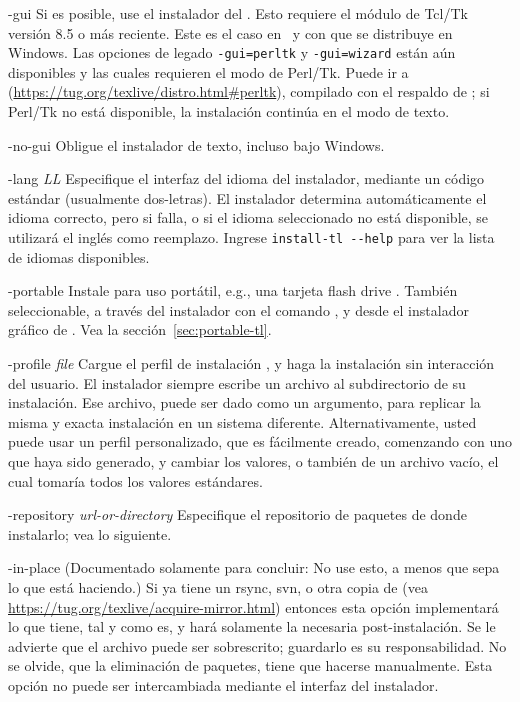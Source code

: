 \documentclass{article}
\begin{document}
\begin{ttdescription}
\item[-gui] Si es posible, use el instalador del \GUI{}. Esto requiere
		el módulo de Tcl/Tk versión 8.5 o más reciente.  Este es el
		caso en \MacOSX\ y con \TL{} que se distribuye en Windows.  Las
		opciones de legado \texttt{-gui=perltk} y \texttt{-gui=wizard}
		están aún disponibles y las cuales requieren el modo de
		Perl/Tk. Puede ir a
		(\url{https://tug.org/texlive/distro.html#perltk}), compilado
		con el respaldo de ; si Perl/Tk no está disponible,
		la instalación continúa en el modo de texto. 

\item[-no-gui] Obligue el instalador de texto, incluso bajo Windows. 

\item[-lang {\sl LL}] Especifique el interfaz del idioma del
	instalador, mediante un código estándar (usualmente
	dos-letras). El instalador determina automáticamente el idioma
	correcto, pero si falla, o si el idioma seleccionado no está
	disponible, se utilizará el inglés como reemplazo. Ingrese
	\verb|install-tl --help| para ver la lista de idiomas
	disponibles.

\item[-portable] Instale para uso portátil, e.g., una tarjeta flash
	drive \USB{}. También seleccionable, a través del instalador
	con el comando , y desde el instalador gráfico de
	\GUI{}. Vea la sección~\ref{sec:portable-tl}.

\item[-profile {\sl file}] Cargue el perfil de instalación ,
	y haga la instalación sin interacción del usuario. El
	instalador siempre escribe un archivo
	 al subdirectorio  de
	su instalación. Ese archivo, puede ser dado como un argumento,
	para replicar la misma y exacta instalación en un sistema
	diferente. Alternativamente, usted puede usar un perfil
	personalizado, que es fácilmente creado, comenzando con uno
	que haya sido generado, y cambiar los valores, o también de un
	archivo vacío, el cual tomaría todos los valores estándares.

\item[-repository {\sl url-or-directory}] Especifique el repositorio
	de paquetes de donde instalarlo; vea lo siguiente.


\item[-in-place] (Documentado solamente para concluir: No use esto, a
	menos que sepa lo que está haciendo.) Si ya tiene un rsync,
	svn, o otra copia de \TL{} (vea
	\url{https://tug.org/texlive/acquire-mirror.html}) entonces
	esta opción implementará lo que tiene, tal y como es, y hará
	solamente la necesaria post-instalación. Se le advierte que el
	archivo  puede ser sobrescrito;
	guardarlo es su responsabilidad. No se olvide, que la
	eliminación de paquetes, tiene que hacerse manualmente. Esta
	opción no puede ser intercambiada mediante el interfaz del
	instalador. 
\end{ttdescription}
\end{document}
